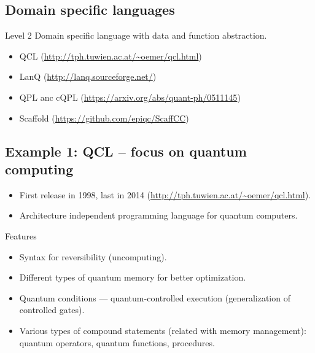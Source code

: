 \documentclass[a4paper,11pt]{article}
\begin{document}
\subsection{Domain specific languages}



{Level 2}
Domain specific language with data and function abstraction.


\begin{itemize}
\item QCL (\url{http://tph.tuwien.ac.at/~oemer/qcl.html})
\item LanQ (\url{http://lanq.sourceforge.net/})
\item QPL anc cQPL (\url{https://arxiv.org/abs/quant-ph/0511145})
\item Scaffold (\url{https://github.com/epiqc/ScaffCC})
\end{itemize}



\subsection{Example 1: QCL -- focus on quantum computing}


\begin{itemize}
\item First release in 1998, last in 2014 
(\url{http://tph.tuwien.ac.at/~oemer/qcl.html}).
\item Architecture independent programming language for quantum 
computers.

\end{itemize}




Features
\begin{itemize}
\item Syntax for reversibility (uncomputing).
\item Different types of quantum memory for better optimization.
\item Quantum conditions --- quantum-controlled execution 
(generalization of controlled 
gates).
\item Various types of compound statements (related with memory 
management): quantum operators, quantum functions, procedures.

\end{itemize}
\end{document}
